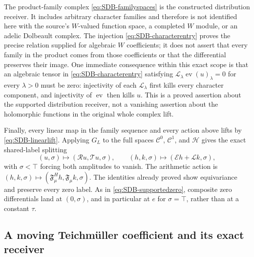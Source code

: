 The product-family complex \eqref{eq:SDB-familyspaces} is the
constructed distribution receiver. It includes arbitrary character
families and therefore is not identified here with the source's
$W$-valued function space, a completed $W$ module, or an adelic
Dolbeault complex. The injection \eqref{eq:SDB-characterentry}
proves the precise relation supplied for algebraic $W$ coefficients;
it does not assert that every family in the product comes from those
coefficients or that the differential preserves their image.
One immediate consequence within this exact scope is that an
algebraic tensor in \eqref{eq:SDB-characterentry} satisfying
$\mathcal L_\lambda\operatorname{ev}(u)_\lambda=0$ for every
$\lambda>0$ must be zero: injectivity of each
$\mathcal L_\lambda$ first kills every character component, and
injectivity of $\operatorname{ev}$ then kills $u$.
This is a proved assertion about the supported distribution receiver,
not a vanishing assertion about the holomorphic functions in the
original whole complex lift.

Finally, every linear map in the family sequence and every action
above lifts by \eqref{eq:SDB-linearlift}. Applying
$G_L$ to the full spaces $\mathcal C^0$, $\mathcal C^1$, and
$\mathcal H$ gives the exact shared-label splitting
\[
 (u,\sigma)\longmapsto(\mathcal Ru,\mathcal Tu,\sigma),\qquad
 (h,k,\sigma)\longmapsto(\mathcal Eh+\mathcal Lk,\sigma),
\]
with $\sigma<\top$ forcing both amplitudes to vanish.
The arithmetic action is
$(h,k,\sigma)\mapsto
 (\mathfrak F_\mu^Hh,\mathfrak F_\mu k,\sigma)$.
The identities already proved show equivariance and preserve every
zero label. As in \eqref{eq:SDB-supportedzero}, composite zero
differentials land at $(0,\sigma)$, and in particular at $e$ for
$\sigma=\top$, rather than at a constant $\tau$.

\subsection{A moving Teichm\"uller coefficient and its exact receiver}

